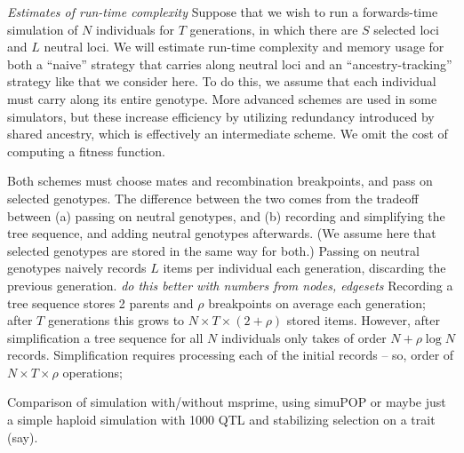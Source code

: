\documentclass{article}
\newcommand{\plr}[1]{{\em \color{blue} #1}}
\begin{document}
\plr{Estimates of run-time complexity}
Suppose that we wish to run a forwards-time simulation of $N$ individuals for $T$ generations,
in which there are $S$ selected loci and $L$ neutral loci.
We will estimate run-time complexity and memory usage for both a ``naive'' strategy that carries along neutral loci
and an ``ancestry-tracking'' strategy like that we consider here.
To do this, we assume that each individual must carry along its entire genotype.
More advanced schemes are used in some simulators,
but these increase efficiency by utilizing redundancy introduced by shared ancestry,
which is effectively an intermediate scheme.
We omit the cost of computing a fitness function.

Both schemes must choose mates and recombination breakpoints,
and pass on selected genotypes.
The difference between the two comes from the tradeoff between
(a) passing on neutral genotypes, and
(b) recording and simplifying the tree sequence, and adding neutral genotypes afterwards.
(We assume here that selected genotypes are stored in the same way for both.)
Passing on neutral genotypes naively records $L$ items per individual each generation, discarding the previous generation.
\plr{do this better with numbers from nodes, edgesets}
Recording a tree sequence stores 2 parents and $\rho$ breakpoints on average each generation;
after $T$ generations this grows to $N \times T \times (2 + \rho)$ stored items.
However, after simplification a tree sequence for all $N$ individuals
only takes of order $N + \rho \log N$ records.
Simplification requires processing each of the initial records -- so, order of $N \times T \times \rho$ operations;



Comparison of simulation with/without msprime, using simuPOP
or maybe just a simple haploid simulation with 1000 QTL and stabilizing selection on a trait (say).
\end{document}
